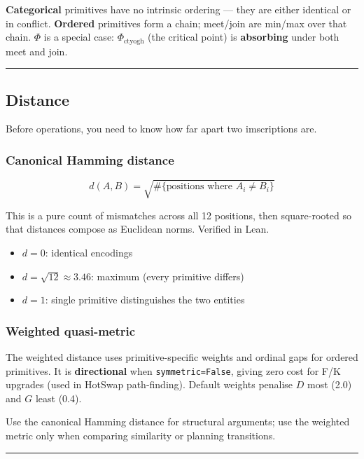 \documentclass[12pt,a4paper]{article}
\begin{document}
\textbf{Categorical} primitives have no intrinsic ordering --- they are either identical or in conflict.
\textbf{Ordered} primitives form a chain; meet/join are min/max over that chain.
\textbf{$\Phi$} is a special case: $\Phi_{\text{ctyogh}}$ (the critical point) is \textbf{absorbing} under both meet and join.

\begin{center}
\rule{0.5\textwidth}{0.4pt}
\end{center}

\subsection{Distance}

Before operations, you need to know how far apart two imscriptions are.

\subsubsection{Canonical Hamming distance}

\[d(A, B) = \sqrt{\#\{\text{positions where } A_i \neq B_i\}}\]

This is a pure count of mismatches across all 12 positions, then square-rooted so that distances compose as Euclidean norms. Verified in Lean.

\begin{itemize}
    \item $d = 0$: identical encodings
    \item $d = \sqrt{12} \approx 3.46$: maximum (every primitive differs)
    \item $d = 1$: single primitive distinguishes the two entities
\end{itemize}

\subsubsection{Weighted quasi-metric}

The weighted distance uses primitive-specific weights and ordinal gaps for ordered primitives. It is \textbf{directional} when \texttt{symmetric=False}, giving zero cost for F/K upgrades (used in HotSwap path-finding). Default weights penalise $D$ most (2.0) and $G$ least (0.4).

Use the canonical Hamming distance for structural arguments; use the weighted metric only when comparing similarity or planning transitions.

\begin{center}
\rule{0.5\textwidth}{0.4pt}
\end{center}
\end{document}
